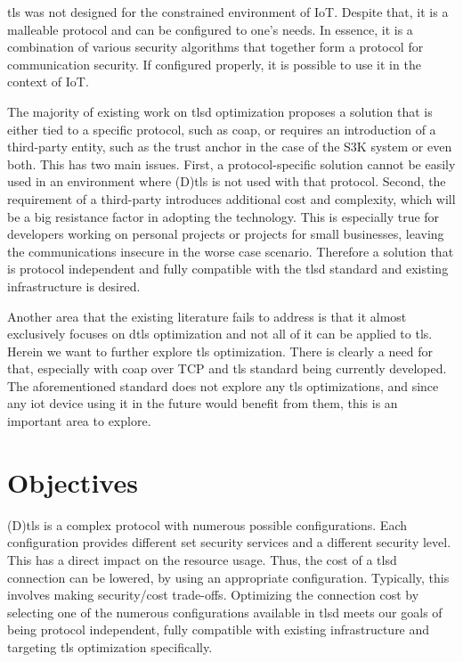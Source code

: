 \gls{tls} was not designed for the constrained environment of IoT. Despite that,
it is a malleable protocol and can be configured to one's needs. In essence,
it is a combination of various security algorithms that together form
a protocol for communication security. If configured
properly, it is possible to use it in the context of IoT.

The majority of existing work on \gls{tlsd} optimization proposes 
a solution that is either tied to a
specific protocol, such as \gls{coap}, or requires an introduction of a third-party
entity, such as the trust anchor in the case of the S3K system\cite{S3KScala62:online} or
even both. This has two main issues. First, a protocol-specific solution cannot
be easily used in an environment where (D)\gls{tls} is not used with that protocol.
Second, the requirement of a third-party
introduces additional cost and complexity, which will be a big resistance factor
in adopting the technology. This is especially true for developers working on
personal projects or projects for small businesses, leaving the communications insecure
in the worse case scenario. Therefore a solution that is protocol independent and fully 
compatible with the \gls{tlsd} standard and existing infrastructure is desired.

Another area that the existing literature fails to address is that it almost exclusively focuses on \gls{dtls} optimization
and not all of it can be applied to \gls{tls}. Herein we want to further explore \gls{tls} optimization. 
There is clearly a need for that,
especially with \gls{coap} over TCP and \gls{tls} standard\cite{I-D.ietf-core-coap-tcp-tls} being currently developed. The
aforementioned standard does not explore any \gls{tls} optimizations, and since any
\gls{iot} device using it in the future would benefit from them, this is an important
area to explore.

\section{Objectives}

(D)\gls{tls} is a complex protocol with numerous possible configurations. Each configuration
provides different set security services and a different security level. This has a direct
impact on the resource usage. Thus, the cost of a \gls{tlsd} connection can be lowered,
by using an appropriate configuration. Typically, this involves making security/cost trade-offs.
Optimizing the connection cost by selecting one of the numerous configurations available in \gls{tlsd}
 meets our goals of being protocol independent, fully compatible with
existing infrastructure and targeting \gls{tls} optimization specifically.

